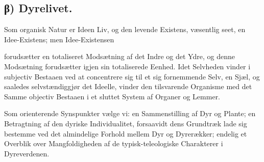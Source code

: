 \documentclass[12pt,a4paper]{book}
\begin{document}
\subsection*{β) Dyrelivet.}

Som organisk Natur er Ideen Liv, og den levende Existens, væsentlig seet, en
Idee-Existens; men Idee-Existensen

\setcounter{footnote}{0}
forudsætter en totaliseret Modsætning af det Indre og det Ydre, og denne
Modsætning forudsætter igjen sin totaliserede Eenhed. Idet Selvheden vinder i
subjectiv Bestaaen ved at concentrere sig til et sig fornemmende Selv, en Sjæl,
og saaledes selvstændiggjør det Ideelle, vinder den tilsvarende Organisme med
det Samme objectiv Bestaaen i et sluttet System af Organer og Lemmer.

Som orienterende Synspunkter vælge vi: en Sammenstilling af Dyr og Plante; en
Betragtning af den dyriske Individualitet, forsaavidt dens Grundtræk lade sig
bestemme ved det almindelige Forhold mellem Dyr og Dyrerækker; endelig et
Overblik over Mangfoldigheden af de typisk-teleologiske Charakterer i
Dyreverdenen.
\end{document}
